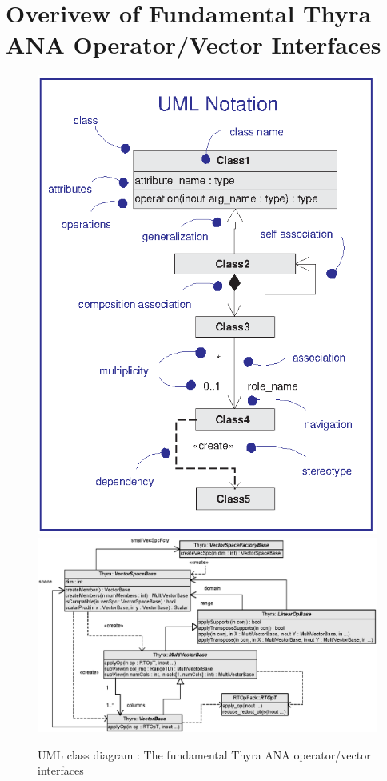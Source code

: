 \documentclass[pdf,ps2pdf,11pt]{SANDreport}
\begin{document}
%
\section{Overivew of Fundamental Thyra ANA Operator/Vector Interfaces}
\label{thyra:sec:Thyra_core_overview}
%

{\bsinglespace
\begin{figure}[p]
\begin{center}
\includegraphics*[bb= 0.0in 0.0in 3.3in 4.4in,scale=0.40
]{UML1}
\includegraphics*[scale=0.65]{ThyraOperatorVector}
\end{center}
\caption{
\label{thyra:fig:basic_op_vec_itfc}
UML class diagram : The fundamental Thyra ANA operator/vector interfaces }
\end{figure}
\esinglespace}
\end{document}
